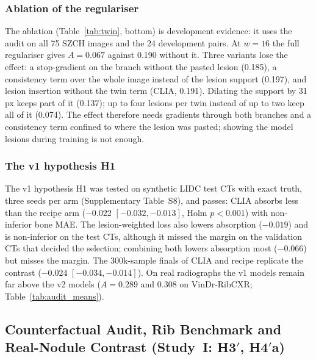 \subsubsection{Ablation of the regulariser}
The ablation (Table~\ref{tab:twin}, bottom) is development evidence: it uses the audit on all 75 SZCH images and the 24 development pairs.
At $w=16$ the full regulariser gives $A=0.067$ against 0.190 without it. Three variants lose the effect: a stop-gradient on the branch
without the pasted lesion (0.185), a consistency term over the whole image instead of the lesion support (0.197), and lesion insertion
without the twin term (CLIA, 0.191). Dilating the support by 31\,px keeps part of it (0.137); up to four lesions per twin instead of up to
two keep all of it (0.074). The effect therefore needs gradients through both branches and a consistency term confined to where the lesion
was pasted; showing the model lesions during training is not enough.

\subsubsection{The v1 hypothesis H1}
The v1 hypothesis H1 was tested on synthetic LIDC test CTs with exact truth, three seeds per arm (Supplementary Table~S8), and passes: CLIA
absorbs less than the recipe arm ($-0.022$ $[-0.032,-0.013]$, Holm $p<0.001$) with non-inferior bone MAE. The lesion-weighted loss also
lowers absorption ($-0.019$) and is non-inferior on the test CTs, although it missed the margin on the validation CTs that decided the
selection; combining both lowers absorption most ($-0.066$) but misses the margin. The 300k-sample finals of CLIA and recipe replicate the
contrast ($-0.024$ $[-0.034,-0.014]$). On real radiographs the v1 models remain far above the v2 models ($A=0.289$ and 0.308 on
VinDr-RibCXR; Table~\ref{tab:audit_means}).

\subsection{Counterfactual Audit, Rib Benchmark and Real-Nodule Contrast (Study~I: H3\texorpdfstring{$'$}{'},
H4\texorpdfstring{$'$}{'}a)}
\label{sec:res-audit}

